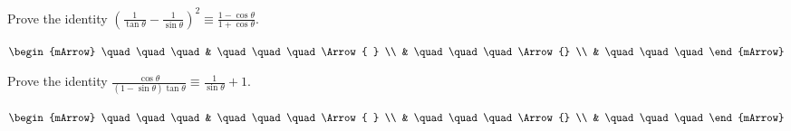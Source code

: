 \begin{mtask}[resume]
    \task \begin{exercise} Prove the identity $ (\frac{1}{\tan \theta} - \frac{1}{\sin \theta})^2  \equiv \frac{1 - \cos \theta}{1 + \cos \theta}$.
            \begin{envSolution}
                $\begin{mArrow}
                      \quad\quad\quad 
                    & \quad\quad\quad      \Arrow{ } \\
                    & \quad\quad\quad      \Arrow{} \\
                    & \quad\quad\quad                                          
                \end{mArrow}$
                \begin{shortsolution}
                    \quad\quad\quad
                \end{shortsolution}
            \end{envSolution}
          \end{exercise}
\end{mtask}


\begin{mtask}[resume]
    \task \begin{exercise} Prove the identity $ \frac{\cos \theta}{(1-\sin \theta) \tan \theta} \equiv \frac{1}{\sin \theta} + 1$.
            \begin{envSolution}
                $\begin{mArrow}
                      \quad\quad\quad 
                    & \quad\quad\quad      \Arrow{ } \\
                    & \quad\quad\quad      \Arrow{} \\
                    & \quad\quad\quad                                          
                \end{mArrow}$
                \begin{shortsolution}
                    \quad\quad\quad
                \end{shortsolution}
            \end{envSolution}
          \end{exercise}
\end{mtask}

